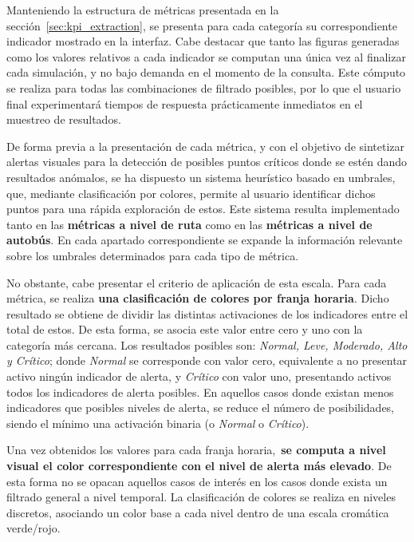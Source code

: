 Manteniendo la estructura de métricas presentada en la sección~\ref{sec:kpi_extraction}, se presenta para cada categoría su
correspondiente indicador mostrado en la interfaz. Cabe destacar que tanto las figuras generadas como los valores relativos a cada 
indicador se computan una única vez al finalizar cada simulación, y no bajo demanda en el momento de la consulta. Este cómputo se 
realiza para todas las combinaciones de filtrado posibles, por lo que el usuario final experimentará tiempos de respuesta prácticamente
inmediatos en el muestreo de resultados. 

De forma previa a la presentación de cada métrica, y con el objetivo de sintetizar alertas visuales
para la detección de posibles puntos críticos donde se estén dando resultados anómalos, se ha dispuesto un sistema heurístico basado
en umbrales, que, mediante clasificación por colores, permite al usuario identificar dichos puntos para una rápida exploración de estos.
Este sistema resulta implementado tanto en las \textbf{métricas a nivel de ruta} como en las \textbf{métricas a nivel de autobús}. 
En cada apartado correspondiente se expande la información relevante sobre los umbrales determinados para cada tipo de 
métrica.

No obstante, cabe presentar el criterio de aplicación de esta escala. Para cada métrica, se realiza \textbf{una clasificación de colores
por franja horaria}. Dicho resultado se obtiene de dividir las distintas activaciones de los indicadores entre el total de estos.
De esta forma, se asocia este valor entre cero y uno con la categoría más cercana. Los resultados posibles son:
\textit{Normal, Leve, Moderado, Alto y Crítico}; donde \textit{Normal} se corresponde con valor cero, equivalente a no presentar
activo ningún indicador de alerta, y \textit{Crítico} con valor uno, presentando activos todos los indicadores de alerta posibles.
En aquellos casos donde existan menos indicadores que posibles niveles de alerta, se reduce el número de posibilidades, siendo el mínimo
una activación binaria (o \textit{Normal} o \textit{Crítico}).

Una vez obtenidos los valores para cada franja horaria,~\textbf{se computa a nivel visual el color correspondiente con el nivel
de alerta más elevado}. De esta forma no se opacan aquellos casos de interés en los casos donde exista un filtrado general a nivel
temporal. La clasificación de colores se realiza en niveles discretos, asociando un color base a cada nivel dentro de una escala cromática
verde/rojo.

